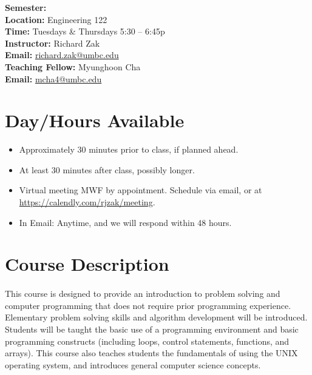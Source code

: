 \documentclass[letter,11pt]{article}
\begin{document}
\textbf{Semester:} \\
\textbf{Location:} Engineering 122 \\
\textbf{Time:} Tuesdays \& Thursdays 5:30 -- 6:45p \\
\textbf{Instructor:} Richard Zak \\
\textbf{Email:} \href{mailto:richard.zak@umbc.edu?Subject=CMSC104}{richard.zak@umbc.edu} \\
\textbf{Teaching Fellow:} Myunghoon Cha \\
\textbf{Email:} \href{mailto:mcha4@umbc.edu?Subject=CMSC104}{mcha4@umbc.edu}

\section*{Day/Hours Available}
\begin{itemize}
\item Approximately 30 minutes prior to class, if planned ahead.
\item At least 30 minutes after class, possibly longer.
\item Virtual meeting MWF by appointment. Schedule via email, or at \url{https://calendly.com/rjzak/meeting}.
\item In Email: Anytime, and we will respond within 48 hours.
\end{itemize}


\section*{Course Description}
\paragraph{}This course is designed to provide an introduction to problem solving and computer programming that does not require prior programming experience. Elementary problem solving skills and algorithm development will be introduced. Students will be taught the basic use of a programming environment and basic programming constructs (including loops, control statements, functions, and arrays). This course also teaches students the fundamentals of using the UNIX operating system, and introduces general computer science concepts.
\end{document}
